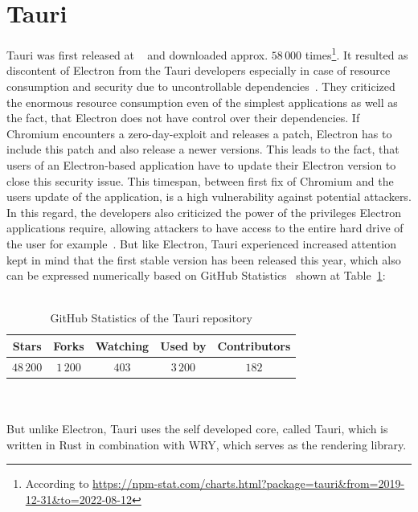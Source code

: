 \section{Tauri}
\label{sec:tauri}
Tauri was first released at ~\cite{tauriRelease} and downloaded approx. $58\,000$ times\footnote{According to \url{https://npm-stat.com/charts.html?package=tauri&from=2019-12-31&to=2022-08-12}}.
It resulted as discontent of Electron from the Tauri developers especially in case of resource consumption and security due to uncontrollable dependencies~\cite{tauri}.
They criticized the enormous resource consumption even of the simplest applications as well as the fact, that Electron does not have control over their dependencies.
If Chromium encounters a zero-day-exploit and releases a patch, Electron has to include this patch and also release a newer versions.
This leads to the fact, that users of an Electron-based application have to update their Electron version to close this security issue.
This timespan, between first fix of Chromium and the users update of the application, is a high vulnerability against potential attackers.
In this regard, the developers also criticized the power of the privileges Electron applications require, allowing attackers to have access to the entire hard drive of the user for example~\cite{tauri}.
But like Electron, Tauri experienced increased attention kept in mind that the first stable version has been released this year, which also can be expressed numerically based on GitHub Statistics~\cite{GithubTauri} shown at Table~\ref{tab:tauri:statistics}: \\ \\
\begin{table}[h]
    \begin{tabular} {| c | c | c | c | c |}
        Stars      & Forks     & Watching & Used by    & Contributors \\ \hline
        $48\,200$ & $1\,200$ & $403$ & $3\,200$ & $182$
    \end{tabular}
    \caption{\label{tab:tauri:statistics} GitHub Statistics of the Tauri repository}
\end{table}\\ \\
But unlike Electron, Tauri uses the self developed core, called Tauri, which is written in Rust in combination with \ac{WRY}, which serves as the rendering library.


